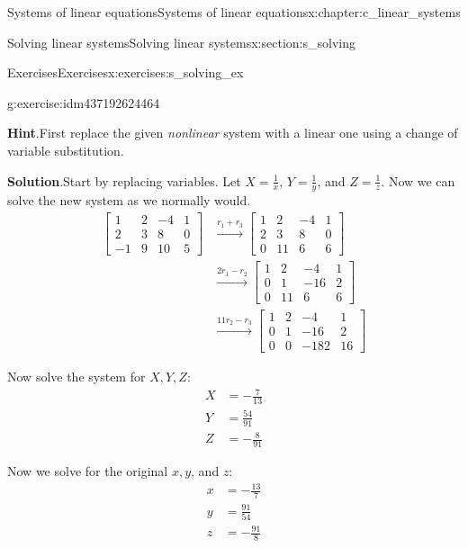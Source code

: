 \documentclass[oneside,10pt,]{book}
\newcommand{\blocktitlefont}{\relax}
\numberwithin{equation}{section}
\newcommand{\amp}{&}
\begin{document}
\begin{chapterptx}{Systems of linear equations}{}{Systems of linear equations}{}{}{x:chapter:c_linear_systems}
\begin{sectionptx}{Solving linear systems}{}{Solving linear systems}{}{}{x:section:s_solving}
\begin{exercises-subsection-numberless}{Exercises}{}{Exercises}{}{}{x:exercises:s_solving_ex}
\begin{divisionexercise}{11}{}{}{g:exercise:idm437192624464}
\begin{equation*}
\end{equation*}
%
\par\smallskip%
\noindent\textbf{\blocktitlefont Hint}.\hypertarget{g:hint:idm437161094448}{}\quad{}First replace the given \emph{nonlinear} system with a linear one using a change of variable substitution.%
\par\smallskip%
\noindent\textbf{\blocktitlefont Solution}.\hypertarget{g:solution:idm437161093680}{}\quad{}Start by replacing variables. Let \(X = \frac{1}{x}\), \(Y = \frac{1}{y}\), and \(Z = \frac{1}{z}\). Now we can solve the new system as we normally would.%
\begin{align*}
\begin{bmatrix}1\amp 2\amp -4\amp 1\\ 2\amp 3\amp 8\amp 0\\ -1\amp 9\amp 10\amp 5 \end{bmatrix} \amp \xrightarrow[]{r_1 + r_3} \begin{bmatrix}1\amp 2\amp -4\amp 1\\ 2\amp 3\amp 8\amp 0\\ 0\amp 11\amp 6\amp 6 \end{bmatrix}\\
\amp \xrightarrow[]{2r_1 - r_2} \begin{bmatrix}1\amp 2\amp -4\amp 1\\ 0\amp 1\amp -16\amp 2\\ 0\amp 11\amp 6\amp 6 \end{bmatrix}\\
\amp \xrightarrow[]{11r_2 - r_3} \begin{bmatrix}1\amp 2\amp -4\amp 1\\ 0\amp 1\amp -16\amp 2\\ 0\amp 0\amp -182\amp 16 \end{bmatrix}
\end{align*}
%
\par
Now solve the system for \(X, Y, Z\):%
\begin{align*}
X\amp =-\frac{7}{13}\\
Y\amp = \frac{54}{91}\\
Z\amp = -\frac{8}{91}
\end{align*}
%
\par
Now we solve for the original \(x, y\), and \(z\):%
\begin{align*}
x\amp =-\frac{13}{7}\\
y\amp = \frac{91}{54}\\
z\amp = -\frac{91}{8}
\end{align*}

\end{divisionexercise}
\end{exercises-subsection-numberless}
\end{sectionptx}
\end{chapterptx}
\end{document}
